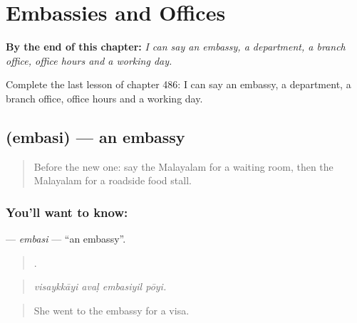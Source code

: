 
\chapter{Embassies and Offices}
\label{ch:ml-embassies-and-offices}

\begin{chapteropening}
\textbf{By the end of this chapter:} \emph{I can say an embassy, a department, a branch office, office hours and a working day.}

Complete the last lesson of chapter 486: I can say an embassy, a department, a branch office, office hours and a working day.
\end{chapteropening}

\section[\texorpdfstring{\ml{എംബസി} (embasi)}{എംബസി (embasi)}]{ (embasi) — an embassy}

\label{lesson:ML-C486-embasi}



\begin{quote}
Before the new one: say the Malayalam for a waiting room, then the Malayalam for a roadside food stall.
\end{quote}

\subsection*{You'll want to know: }
\textbf{} — \emph{embasi} — \textquotedblleft{}an embassy\textquotedblright{}.

\begin{quote}
   .
\end{quote}

\begin{quote}
\emph{visaykkāyi avaḷ embasiyil pōyi.}
\end{quote}

\begin{quote}
She went to the embassy for a visa.
\end{quote}

